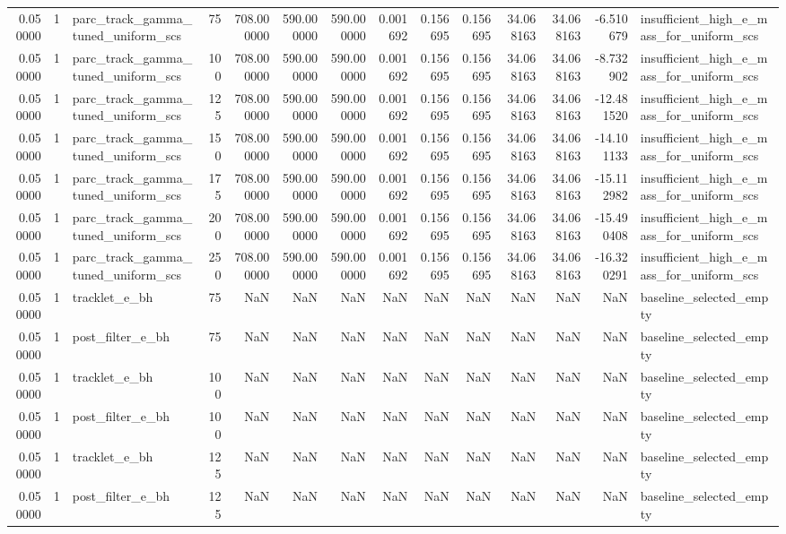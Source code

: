 \begin{tabular}{rrlrrrrrrrrrrl}
0.050000 & 1 & parc_track_gamma_tuned_uniform_scs & 75 & 708.000000 & 590.000000 & 590.000000 & 0.001692 & 0.156695 & 0.156695 & 34.068163 & 34.068163 & -6.510679 & insufficient_high_e_mass_for_uniform_scs \\
0.050000 & 1 & parc_track_gamma_tuned_uniform_scs & 100 & 708.000000 & 590.000000 & 590.000000 & 0.001692 & 0.156695 & 0.156695 & 34.068163 & 34.068163 & -8.732902 & insufficient_high_e_mass_for_uniform_scs \\
0.050000 & 1 & parc_track_gamma_tuned_uniform_scs & 125 & 708.000000 & 590.000000 & 590.000000 & 0.001692 & 0.156695 & 0.156695 & 34.068163 & 34.068163 & -12.481520 & insufficient_high_e_mass_for_uniform_scs \\
0.050000 & 1 & parc_track_gamma_tuned_uniform_scs & 150 & 708.000000 & 590.000000 & 590.000000 & 0.001692 & 0.156695 & 0.156695 & 34.068163 & 34.068163 & -14.101133 & insufficient_high_e_mass_for_uniform_scs \\
0.050000 & 1 & parc_track_gamma_tuned_uniform_scs & 175 & 708.000000 & 590.000000 & 590.000000 & 0.001692 & 0.156695 & 0.156695 & 34.068163 & 34.068163 & -15.112982 & insufficient_high_e_mass_for_uniform_scs \\
0.050000 & 1 & parc_track_gamma_tuned_uniform_scs & 200 & 708.000000 & 590.000000 & 590.000000 & 0.001692 & 0.156695 & 0.156695 & 34.068163 & 34.068163 & -15.490408 & insufficient_high_e_mass_for_uniform_scs \\
0.050000 & 1 & parc_track_gamma_tuned_uniform_scs & 250 & 708.000000 & 590.000000 & 590.000000 & 0.001692 & 0.156695 & 0.156695 & 34.068163 & 34.068163 & -16.320291 & insufficient_high_e_mass_for_uniform_scs \\
0.050000 & 1 & tracklet_e_bh & 75 & NaN & NaN & NaN & NaN & NaN & NaN & NaN & NaN & NaN & baseline_selected_empty \\
0.050000 & 1 & post_filter_e_bh & 75 & NaN & NaN & NaN & NaN & NaN & NaN & NaN & NaN & NaN & baseline_selected_empty \\
0.050000 & 1 & tracklet_e_bh & 100 & NaN & NaN & NaN & NaN & NaN & NaN & NaN & NaN & NaN & baseline_selected_empty \\
0.050000 & 1 & post_filter_e_bh & 100 & NaN & NaN & NaN & NaN & NaN & NaN & NaN & NaN & NaN & baseline_selected_empty \\
0.050000 & 1 & tracklet_e_bh & 125 & NaN & NaN & NaN & NaN & NaN & NaN & NaN & NaN & NaN & baseline_selected_empty \\
0.050000 & 1 & post_filter_e_bh & 125 & NaN & NaN & NaN & NaN & NaN & NaN & NaN & NaN & NaN & baseline_selected_empty \\

\end{tabular}
